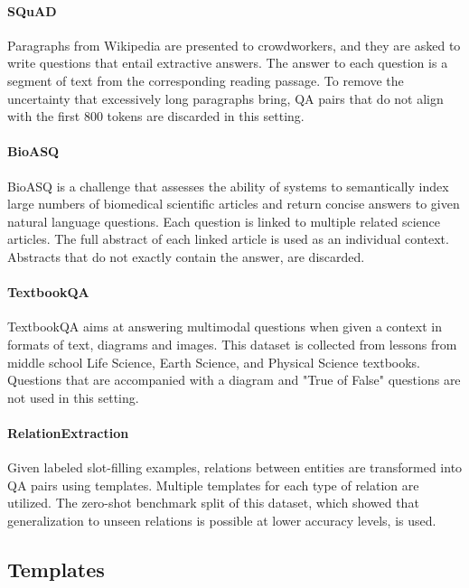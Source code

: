 \paragraph{SQuAD \cite{rajpurkar2016squad100000questionsmachine}}
Paragraphs from Wikipedia are presented to crowdworkers, and they are asked to write questions that entail extractive answers.
The answer to each question is a segment of text from the corresponding reading passage.
To remove the uncertainty that excessively long paragraphs bring, QA pairs that do not align with the first 800 tokens are discarded in this setting.

\paragraph{BioASQ \cite{tsatsaronis2015overview}}
BioASQ is a challenge that assesses the ability of systems to semantically index large numbers of biomedical scientific articles and return concise answers to given natural language questions.
Each question is linked to multiple related science articles. The full abstract of each linked article is used as an individual context. Abstracts that do not exactly contain the answer, are discarded.

\paragraph{TextbookQA \cite{Kembhavi_2017_CVPR}}
TextbookQA aims at answering multimodal questions when given a context in formats of text, diagrams and images.
This dataset is collected from lessons from middle school Life Science, Earth Science, and Physical Science textbooks.
Questions that are accompanied with a diagram and "True of False" questions are not used in this setting.

\paragraph{RelationExtraction \cite{levy2017zeroshotrelationextractionreading}}
Given labeled slot-filling examples, relations between entities are transformed into QA pairs using templates. Multiple templates for each type of relation are utilized.
The zero-shot benchmark split of this dataset, which showed that generalization to unseen relations is possible at lower accuracy levels, is used. 




\subsection{Templates}

